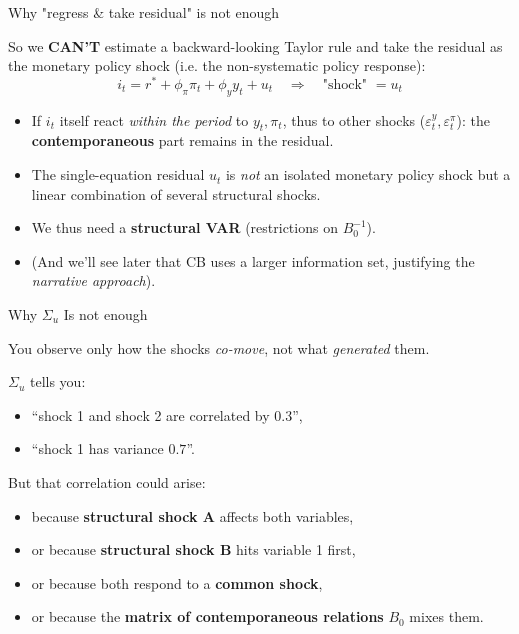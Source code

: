 \documentclass{beamer}
\begin{document}
\begin{frame}{Why "regress \& take residual" is not enough}

So we \textbf{CAN'T} estimate a backward-looking Taylor rule and take the residual as the monetary policy shock (i.e. the non-systematic policy response): 
\[
i_t = r^* + \phi_\pi \pi_t + \phi_y y_t + u_t
\quad\Rightarrow\quad
\text{"shock" } = u_t
\]
\begin{itemize}
  \item If $i_t$ itself react \emph{within the period} to $y_t,\pi_t$, thus to other shocks ($\varepsilon^y_t,\varepsilon^\pi_t$): the
\textbf{contemporaneous} part remains in the residual.

\medskip
\item The single-equation residual $u_t$ is \emph{not} an isolated monetary policy shock but a linear combination of several structural shocks. 
\item We thus need a \textbf{structural VAR} (restrictions on $ B_0^{-1}$). 
\item (And we'll see later that CB uses a larger information set, justifying the \textit{narrative approach}).
\end{itemize}
\end{frame}



\begin{frame}{Why $\Sigma_u$ Is not enough}

You observe only how the shocks \emph{co-move}, not what \emph{generated} them.

\medskip
$\Sigma_u$ tells you:
\begin{itemize}
    \item ``shock 1 and shock 2 are correlated by $0.3$'',
    \item ``shock 1 has variance $0.7$''.
\end{itemize}

\medskip
But that correlation could arise:
\begin{itemize}
    \item because \textbf{structural shock A} affects both variables,
    \item or because \textbf{structural shock B} hits variable 1 first,
    \item or because both respond to a \textbf{common shock},
    \item or because the \textbf{matrix of contemporaneous relations }$B_0$ mixes them.
\end{itemize}

\end{frame}
\end{document}
